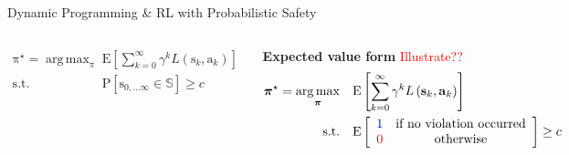 \documentclass[lecture]{beamer}
\DeclareMathOperator*{\argmax}{arg\,max}
\newcommand{\vect}[1]{\ensuremath{\boldsymbol{\mathrm{#1}}}}
\begin{document}
\begin{frame}{\normalsize Dynamic Programming \& RL with Probabilistic Safety}
\footnotesize
\begin{columns}[t]
\begin{columns}[t]


\begin{alertblock}{}
\vspace{-.2cm}
\begin{align*}
\vect\pi^\star = \argmax_{\vect\pi}&\quad\mathrm E\left[ \sum_{k=0}^\infty \gamma^kL\left(\vect s_k,\vect a_k\right)\right]\\
\mathrm{s.t.}&\quad \mathrm{P}\left[ \vect s_{0,\ldots\infty}\in \mathbb S\right] \geq c
\end{align*}
\end{alertblock}
\end{columns}
\begin{block}{}
\textbf{Expected value form} \textcolor{red}{Illustrate??}
\vspace{-.2cm}
\begin{align*}
\vect\pi^\star = \argmax_{\vect\pi}&\quad\mathrm E\left[ \sum_{k=0}^\infty \gamma^kL\left(\vect s_k,\vect a_k\right)\right]\\
\mathrm{s.t.}&\quad \mathrm{E}\left[ \begin{array}{cc}\textcolor{blue}{1}&\text{if no violation occurred}\\\textcolor{myRed}{0}&\text{otherwise}\end{array} \right] \geq c
\end{align*}
\end{block}


\end{columns}
\end{frame}
\end{document}
